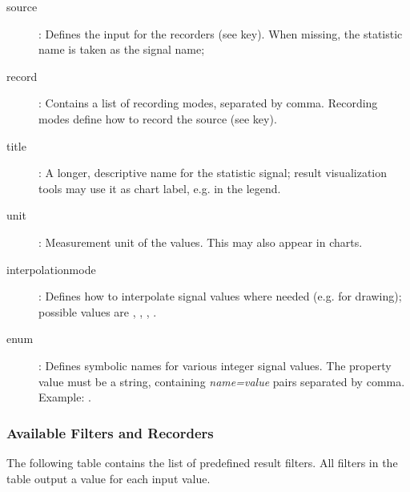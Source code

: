 \begin{ned}
\begin{description}
  \item[source]: Defines the input for the recorders (see  key).
     When missing, the statistic name is taken as the signal name;
  \item[record]: Contains a list of recording modes, separated by comma.
     Recording modes define how to record the source (see  key).
  \item[title]: A longer, descriptive name for the statistic signal; result
      visualization tools may use it as chart label, e.g. in the legend.
  \item[unit]: Measurement unit of the values. This may also appear in charts.
  \item[interpolationmode]: Defines how to interpolate signal values where
      needed (e.g. for drawing); possible values are ,
      , , .
  \item[enum]: Defines symbolic names for various integer signal values.
      The property value must be a string, containing \textit{name=value} pairs
      separated by comma. Example: .
\end{description}


\subsubsection{Available Filters and Recorders}
\label{sec:simple-modules:available-result-filters-and-recorders}

The following table contains the list of predefined result filters.
All filters in the table output a value for each input value.


\end{ned}
